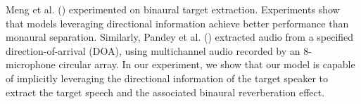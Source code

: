 Meng et al. (\citeyear{meng2024binauralselective}) experimented on binaural target extraction. Experiments show that models leveraging directional information achieve better performance than monaural separation. Similarly, 
Pandey et al. (\citeyear{pandey2024neurallowlatency}) extracted audio from a specified direction-of-arrival (DOA), using multichannel audio recorded by an 8-microphone circular array. In our experiment, we show that our model is capable of implicitly leveraging the directional information of the target speaker to extract the target speech and the associated binaural reverberation effect. 

